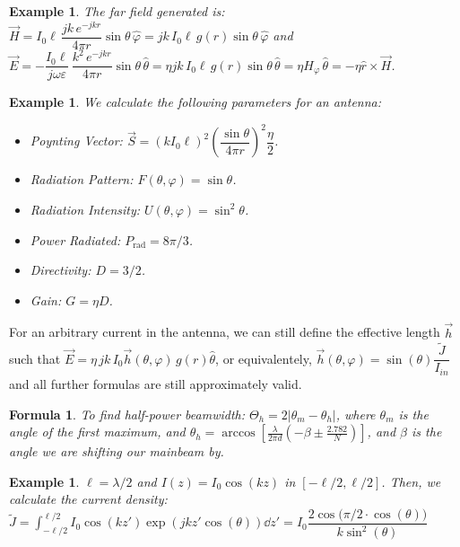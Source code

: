 \documentclass[11pt,landscape]{article}
\let\eps\varepsilon
\newtheorem{formula}[definition]{Formula}
\newtheorem{example}[definition]{Example}
\begin{document}
\begin{multicols}{3}
\begin{example}
    The far field generated is: $\vec{H}=I_0\ell \,\dfrac{jk\,e^{-jkr}}{4\pi r}\sin{\theta}\,\hat{\varphi}=jk\,I_0\ell\, g(r)\sin\theta\,\hat{\varphi}$ and $\vec{E}=-\dfrac{I_0\ell}{j\omega\eps}\,\dfrac{k^2\,e^{-jkr}}{4\pi r}\sin{\theta}\,\hat{\theta}=\eta jk\,I_0\ell\, g(r)\sin\theta\,\hat{\theta}=\eta H_\varphi\,\hat{\theta}=-\eta\hat{r}\times\vec{H}$.
\end{example}

\begin{example}
    We calculate the following parameters for an antenna:
    \begin{itemize}
        \item Poynting Vector: $\vec{S}= (kI_0\ell)^2\left(\dfrac{\sin\theta}{4\pi r}\right)^2\dfrac{\eta}{2}$.
        \item Radiation Pattern: $F(\theta, \varphi) = \sin\theta$.
        \item Radiation Intensity: $\displaystyle U(\theta,\varphi) = \sin^2{\theta}$.
        \item Power Radiated: $P_\text{rad}=8\pi/3$.
        \item Directivity: $D=3/2$.
        \item Gain: $G=\eta D$.
    \end{itemize}
\end{example}

\noindent
For an arbitrary current in the antenna, we can still define the effective length $\vec{h}$ such that $\vec{E}=\eta\, jk\, I_0\vec{h}(\theta,\varphi)\, g(r)\hat{\theta}$, or equivalentely, $\vec{h}(\theta,\varphi)=\sin(\theta)\dfrac{\tilde{J}}{I_{in}}$ and all further formulas are still approximately valid.

\begin{formula}
    To find half-power beamwidth: $\Theta_h=2|\theta_m-\theta_h|$, where $\theta_m$ is the angle of the first maximum, and $\theta_h=\arccos[\frac{\lambda}{2\pi d}\left(-\beta\pm\frac{2.782}{N}\right)]$, and $\beta$ is the angle we are shifting our mainbeam by.
\end{formula}

\begin{example}
    $\ell=\lambda/2$ and $I(z)=I_0\cos(kz)$ in $[-\ell/2,\ell/2]$. Then, we calculate the current density: $\tilde{J}=\displaystyle\int_{-\ell/2}^{\ell/2}I_0\cos(kz')\exp(jkz'\cos(\theta))\dd{z'}=I_0\dfrac{2\cos\big(\pi/2 \cdot \cos(\theta)\big)}{k\sin^2(\theta)}$
\end{example}


\end{multicols}
\end{document}
